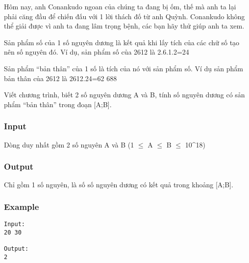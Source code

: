 



   Hôm nay, anh Conankudo ngoan của chúng ta đang bị ốm, thế mà anh ta lại phải căng đầu để chiến đấu với 1 lời thách đố từ anh Quỳnh. Conankudo không thể giải được vì anh ta đang lâm trọng bệnh, các bạn hãy thử giúp anh ta xem.  

   Sản phẩm số của 1 số nguyên dương là kết quả khi lấy tích của các chữ số tạo nên số nguyên đó. Ví dụ, sản phẩm số của 2612 là 2.6.1.2=24  

   Sản phẩm “bản thân” của 1 số      là tích của nó với sản phẩm số. Ví dụ sản phẩm bản thân của 2612 là 2612.24=62 688  

   Viết chương trình, biết 2 số nguyên dương A và B, tính số nguyên dương có sản phẩm “bản thân” trong đoạn [A;B].  

\subsubsection{   Input  }

   Dòng duy nhất gồm 2 số nguyên A và B (1 $\le$ A $\le$ B $\le$ 10\textasciicircum18)  

\subsubsection{   Output  }

   Chỉ gồm 1 số nguyên, là số số nguyên dương có kết quả trong khoảng [A;B].  

\subsubsection{   Example  }
\begin{verbatim}
Input:
20 30

Output:
2
\end{verbatim}

